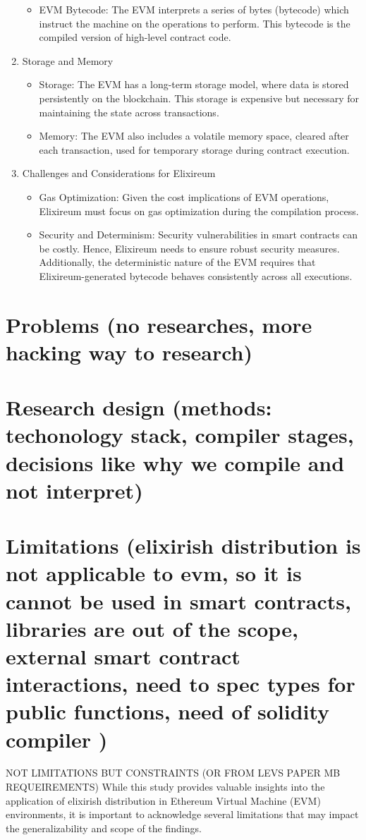 \begin{enumerate}
\begin{itemize}
              \item           EVM Bytecode: The EVM interprets a series of bytes (bytecode) which instruct the machine on the operations to perform. This bytecode is the compiled version of high-level contract code.
          \end{itemize}
    \item Storage and Memory
          \begin{itemize}
              \item   Storage: The EVM has a long-term storage model, where data is stored persistently on the blockchain. This storage is expensive but necessary for maintaining the state across transactions.
              \item         Memory: The EVM also includes a volatile memory space, cleared after each transaction, used for temporary storage during contract execution.
          \end{itemize}
    \item Challenges and Considerations for Elixireum
          \begin{itemize}
              \item Gas Optimization: Given the cost implications of EVM operations, Elixireum must focus on gas optimization during the compilation process.
              \item Security and Determinism: Security vulnerabilities in smart contracts can be costly. Hence, Elixireum needs to ensure robust security measures. Additionally, the deterministic nature of the EVM requires that Elixireum-generated bytecode behaves consistently across all executions.
          \end{itemize}



\end{enumerate}




\section{Problems (no researches, more hacking way to research)}
\label{}

\section{Research design (methods: techonology stack, compiler stages, decisions like why we compile and not interpret)}
\label{}

\section{Limitations (elixirish distribution is not applicable to evm, so it is cannot be used in smart contracts, libraries are out of the scope, external smart contract interactions, need to spec types for public functions, need of solidity compiler )}
\label{}
NOT LIMITATIONS BUT CONSTRAINTS (OR FROM LEVS PAPER MB REQUEIREMENTS)
While this study provides valuable insights into the application of elixirish distribution in Ethereum Virtual Machine (EVM) environments, it is important to acknowledge several limitations that may impact the generalizability and scope of the findings.

